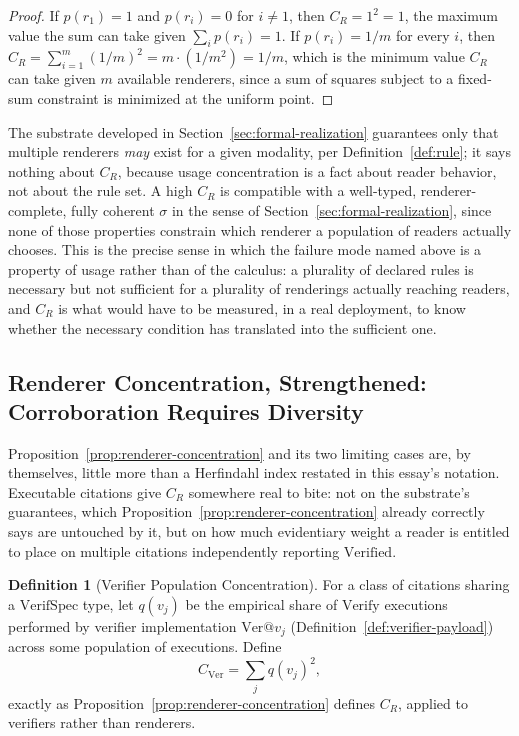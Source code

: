 \documentclass[11pt]{article}
\theoremstyle{definition}
\newtheorem{definition}[theorem]{Definition}
\begin{document}
\begin{proof}
If $p(r_1) = 1$ and $p(r_i) = 0$ for $i \neq 1$, then $C_R = 1^2 = 1$, the maximum value the sum can take given $\sum_i p(r_i) = 1$. If $p(r_i) = 1/m$ for every $i$, then $C_R = \sum_{i=1}^m (1/m)^2 = m \cdot (1/m^2) = 1/m$, which is the minimum value $C_R$ can take given $m$ available renderers, since a sum of squares subject to a fixed-sum constraint is minimized at the uniform point.
\end{proof}

The substrate developed in Section~\ref{sec:formal-realization} guarantees only that multiple renderers \emph{may} exist for a given modality, per Definition~\ref{def:rule}; it says nothing about $C_R$, because usage concentration is a fact about reader behavior, not about the rule set. A high $C_R$ is compatible with a well-typed, renderer-complete, fully coherent $\sigma$ in the sense of Section~\ref{sec:formal-realization}, since none of those properties constrain which renderer a population of readers actually chooses. This is the precise sense in which the failure mode named above is a property of usage rather than of the calculus: a plurality of declared rules is necessary but not sufficient for a plurality of renderings actually reaching readers, and $C_R$ is what would have to be measured, in a real deployment, to know whether the necessary condition has translated into the sufficient one.

\subsection{Renderer Concentration, Strengthened: Corroboration Requires Diversity}
\label{sec:renderer-concentration-strengthened}

Proposition~\ref{prop:renderer-concentration} and its two limiting cases are, by themselves, little more than a Herfindahl index restated in this essay's notation. Executable citations give $C_R$ somewhere real to bite: not on the substrate's guarantees, which Proposition~\ref{prop:renderer-concentration} already correctly says are untouched by it, but on how much evidentiary weight a reader is entitled to place on multiple citations independently reporting $\mathrm{Verified}$.

\begin{definition}[Verifier Population Concentration]
\label{def:verifier-concentration}
For a class of citations sharing a $\mathrm{VerifSpec}$ type, let $q(v_j)$ be the empirical share of $\mathrm{Verify}$ executions performed by verifier implementation $\mathrm{Ver}@v_j$ (Definition~\ref{def:verifier-payload}) across some population of executions. Define
\[
C_{\mathrm{Ver}} = \sum_j q(v_j)^2,
\]
exactly as Proposition~\ref{prop:renderer-concentration} defines $C_R$, applied to verifiers rather than renderers.
\end{definition}
\end{document}
